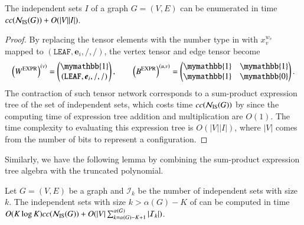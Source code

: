 \documentclass[review, onefignum, onetabnum]{siamart190516}
\begin{document}
\begin{theorem}\label{thm:complexexpr}
        The independent sets $I$ of a graph $G=(V,E)$ can be enumerated in time $cc({\mathcal{N}_{\rm IS}(G)}) + O(|V||I|)$.
\end{theorem}
\begin{proof}
By replacing the tensor elements with the number type in  with $x_v^{w_v}$ mapped to $(\texttt{LEAF},\boldsymbol{e}_i,/,/)$, the vertex tensor and edge tensor become
\begin{equation}
    \left(W^{\rm EXPR}\right)^{(v)} = \left(\begin{matrix}
        \mymathbb{1} \\
        (\texttt{LEAF},\boldsymbol{e}_i,/,/)
    \end{matrix}\right),   
    \qquad
        \left(B^{\rm EXPR}\right)^{(u, v)} = \left(\begin{matrix}
        \mymathbb{1}  & \mymathbb{1} \\
        \mymathbb{1} & \mymathbb{0}
    \end{matrix}\right).
\end{equation}
The contraction of such tensor network corresponds to a sum-product expression tree of the set of independent sets, which costs time $cc({\mathcal{N}_{\rm IS}(G)})$ by  since the computing time of expression tree addition and multiplication are $O(1)$.
The time complexity to evaluating this expression tree is $O(|V||I|)$, where $|V|$ comes from the number of bits to represent a configuration.
\end{proof}

Similarly, we have the following lemma by combining the sum-product expression tree algebra with the truncated polynomial.

\begin{lemma}\label{thm:complexexprk}
        Let $G = (V, E)$ be a graph and $\mathcal{I}_k$ be the number of independent sets with size $k$. The independent sets with size $k > \alpha(G)-K$ of can be computed in time $O(K\log K)cc({\mathcal{N}_{\rm IS}(G)}) + O(|V|\sum_{k=\alpha(G)-K+1}^{\alpha(G)}|\mathcal{I}_k|)$.
\end{lemma}
\end{document}
